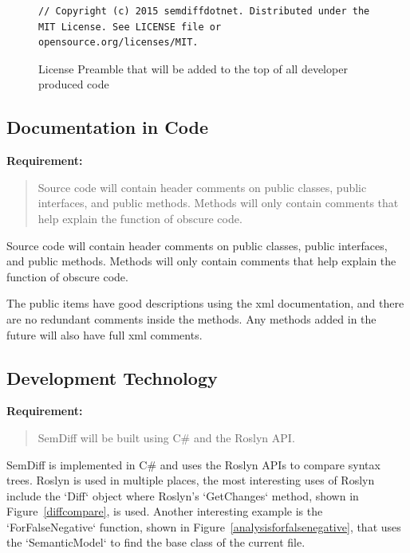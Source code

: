 \documentclass[draftclsnofoot,onecolumn]{IEEEtran}
\begin{document}
\begin{figure}[!t]
\centering
\begin{lstlisting}
// Copyright (c) 2015 semdiffdotnet. Distributed under the MIT License. See LICENSE file or opensource.org/licenses/MIT.
\end{lstlisting}
\caption{License Preamble that will be added to the top of all developer 
produced code}
\label{mitheader}
\end{figure} 





\subsection{Documentation in Code}

\textbf{Requirement:}

\begin{quote}

Source code will contain header comments on public classes, public 
interfaces, and public methods. Methods will only contain comments that help 
explain the function of obscure code.

\end{quote}

Source code will contain header comments on public classes, public 
interfaces, and public methods. Methods will only contain comments that help 
explain the function of obscure code.

The public items have good descriptions using the xml documentation, and 
there are no redundant comments inside the methods. Any methods added in the 
future will also have full xml comments.






\subsection{Development Technology}

\textbf{Requirement:}

\begin{quote}

SemDiff will be built using C\# and the Roslyn API.

\end{quote}

SemDiff is implemented in C\# and uses the Roslyn APIs to compare syntax 
trees. Roslyn is used in multiple places, the most interesting uses of 
Roslyn include the `Diff` object where Roslyn’s `GetChanges` method, shown 
in Figure~\ref{diffcompare}, is used. Another interesting example is the 
`ForFalseNegative` function, shown in Figure~\ref{analysisforfalsenegative}, 
that uses the `SemanticModel` to find the base class of the current file.
\end{document}
